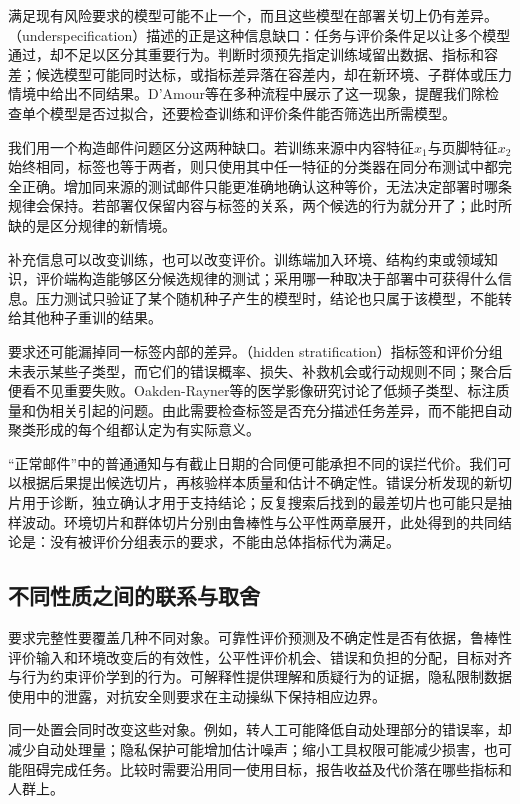 满足现有风险要求的模型可能不止一个，而且这些模型在部署关切上仍有差异。（underspecification）描述的正是这种信息缺口：任务与评价条件足以让多个模型通过，却不足以区分其重要行为。判断时须预先指定训练域留出数据、指标和容差；候选模型可能同时达标，或指标差异落在容差内，却在新环境、子群体或压力情境中给出不同结果。D'Amour等在多种流程中展示了这一现象，提醒我们除检查单个模型是否过拟合，还要检查训练和评价条件能否筛选出所需模型。

我们用一个构造邮件问题区分这两种缺口。若训练来源中内容特征$x_1$与页脚特征$x_2$始终相同，标签也等于两者，则只使用其中任一特征的分类器在同分布测试中都完全正确。增加同来源的测试邮件只能更准确地确认这种等价，无法决定部署时哪条规律会保持。若部署仅保留内容与标签的关系，两个候选的行为就分开了；此时所缺的是区分规律的新情境。

补充信息可以改变训练，也可以改变评价。训练端加入环境、结构约束或领域知识，评价端构造能够区分候选规律的测试；采用哪一种取决于部署中可获得什么信息。压力测试只验证了某个随机种子产生的模型时，结论也只属于该模型，不能转给其他种子重训的结果。

要求还可能漏掉同一标签内部的差异。（hidden stratification）指标签和评价分组未表示某些子类型，而它们的错误概率、损失、补救机会或行动规则不同；聚合后便看不见重要失败。Oakden-Rayner等的医学影像研究讨论了低频子类型、标注质量和伪相关引起的问题。由此需要检查标签是否充分描述任务差异，而不能把自动聚类形成的每个组都认定为有实际意义。

“正常邮件”中的普通通知与有截止日期的合同便可能承担不同的误拦代价。我们可以根据后果提出候选切片，再核验样本质量和估计不确定性。错误分析发现的新切片用于诊断，独立确认才用于支持结论；反复搜索后找到的最差切片也可能只是抽样波动。环境切片和群体切片分别由鲁棒性与公平性两章展开，此处得到的共同结论是：没有被评价分组表示的要求，不能由总体指标代为满足。

\subsection{不同性质之间的联系与取舍}

要求完整性要覆盖几种不同对象。可靠性评价预测及不确定性是否有依据，鲁棒性评价输入和环境改变后的有效性，公平性评价机会、错误和负担的分配，目标对齐与行为约束评价学到的行为。可解释性提供理解和质疑行为的证据，隐私限制数据使用中的泄露，对抗安全则要求在主动操纵下保持相应边界。

同一处置会同时改变这些对象。例如，转人工可能降低自动处理部分的错误率，却减少自动处理量；隐私保护可能增加估计噪声；缩小工具权限可能减少损害，也可能阻碍完成任务。比较时需要沿用同一使用目标，报告收益及代价落在哪些指标和人群上。

